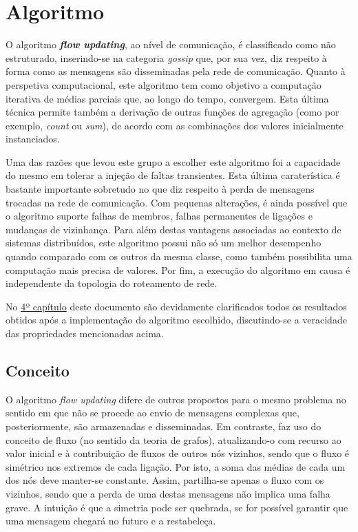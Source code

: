 \documentclass[a4paper]{article}
\begin{document}
\section{Algoritmo} \label{sec:Algorithm}
\large{
	O algoritmo \textbf{\textit{flow updating}}, ao nível de comunicação, é classificado como não estruturado, inserindo-se na categoria \textit{gossip} que, por sua vez, diz respeito à forma como as mensagens são disseminadas pela rede de comunicação.
	Quanto à perspetiva computacional, este algoritmo tem como objetivo a computação iterativa de médias parciais que, ao longo do tempo, convergem.
	Esta última técnica permite também a derivação de outras funções de agregação (como por exemplo, \textit{count} ou \textit{sum}), de acordo com as combinações dos valores inicialmente instanciados.

	Uma das razões que levou este grupo a escolher este algoritmo foi a capacidade do mesmo em tolerar a injeção de faltas transientes. 
	Esta última caraterística é bastante importante sobretudo no que diz respeito à perda de mensagens trocadas na rede de comunicação.
	Com pequenas alterações, é ainda possível que o algoritmo suporte falhas de membros, falhas permanentes de ligações e mudanças de vizinhança.
	Para além destas vantagens associadas ao contexto de sistemas distribuídos, este algoritmo possui não só um melhor desempenho quando comparado com os outros da mesma classe, como também possibilita uma computação mais precisa de valores.
	Por fim, a execução do algoritmo em causa é independente da topologia do roteamento de rede.

	No \hyperref[sec:Analysis of results]{4º capítulo} deste documento são devidamente clarificados todos os resultados obtidos após a implementação do algoritmo escolhido, discutindo-se a veracidade das propriedades mencionadas acima.

	\subsection{Conceito} \label{subsec:Concept}
	O algoritmo \textit{flow updating} difere de outros propostos para o mesmo problema no sentido em que não se procede ao envio de mensagens complexas que, posteriormente, são armazenadas e disseminadas.
	Em contraste, faz uso do conceito de fluxo (no sentido da teoria de grafos), atualizando-o com recurso ao valor inicial e à contribuição de fluxos de outros nós vizinhos, sendo que o fluxo é simétrico nos extremos de cada ligação. Por isto, a soma das médias de cada um dos nós deve manter-se constante.
	Assim, partilha-se apenas o fluxo com os vizinhos, sendo que a perda de uma destas mensagens não implica uma falha grave.
	A intuição é que a simetria pode ser quebrada, se for possível garantir que uma mensagem chegará no futuro e a restabeleça.

}
\end{document}
